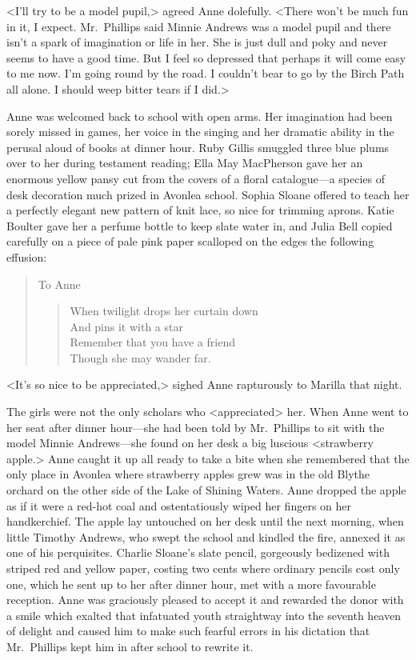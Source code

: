 <I'll try to be a model pupil,> agreed Anne dolefully. <There won't be much fun in it, I expect. Mr.~Phillips said Minnie Andrews was a model pupil and there isn't a spark of imagination or life in her. She is just dull and poky and never seems to have a good time. But I feel so depressed that perhaps it will come easy to me now. I'm going round by the road. I couldn't bear to go by the Birch Path all alone. I should weep bitter tears if I did.>

Anne was welcomed back to school with open arms. Her imagination had been sorely missed in games, her voice in the singing and her dramatic ability in the perusal aloud of books at dinner hour. Ruby Gillis smuggled three blue plums over to her during testament reading; Ella May MacPherson gave her an enormous yellow pansy cut from the covers of a floral catalogue—a species of desk decoration much prized in Avonlea school. Sophia Sloane offered to teach her a perfectly elegant new pattern of knit lace, so nice for trimming aprons. Katie Boulter gave her a perfume bottle to keep slate water in, and Julia Bell copied carefully on a piece of pale pink paper scalloped on the edges the following effusion:

\begin{quote}
\noindent To Anne

\begin{verse}
When twilight drops her curtain down\\
And pins it with a star\\
Remember that you have a friend\\
Though she may wander far.
\end{verse}
\end{quote}

<It's so nice to be appreciated,> sighed Anne rapturously to Marilla that night.

The girls were not the only scholars who <appreciated> her. When Anne went to her seat after dinner hour—she had been told by Mr.~Phillips to sit with the model Minnie Andrews—she found on her desk a big luscious <strawberry apple.> Anne caught it up all ready to take a bite when she remembered that the only place in Avonlea where strawberry apples grew was in the old Blythe orchard on the other side of the Lake of Shining Waters. Anne dropped the apple as if it were a red-hot coal and ostentatiously wiped her fingers on her handkerchief. The apple lay untouched on her desk until the next morning, when little Timothy Andrews, who swept the school and kindled the fire, annexed it as one of his perquisites. Charlie Sloane's slate pencil, gorgeously bedizened with striped red and yellow paper, costing two cents where ordinary pencils cost only one, which he sent up to her after dinner hour, met with a more favourable reception. Anne was graciously pleased to accept it and rewarded the donor with a smile which exalted that infatuated youth straightway into the seventh heaven of delight and caused him to make such fearful errors in his dictation that Mr.~Phillips kept him in after school to rewrite it.

